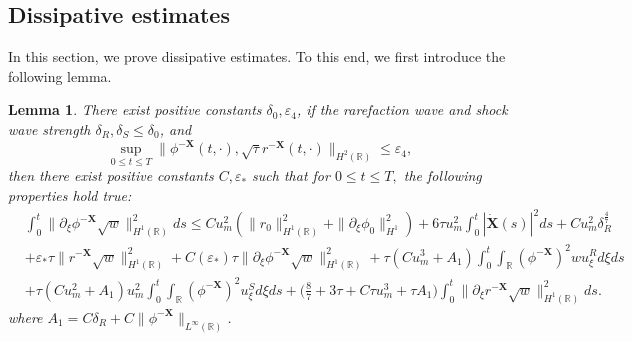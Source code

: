 \documentclass[10pt,reqno]{amsart}
\numberwithin{equation}{section}
\newtheorem{lemma}[theorem]{Lemma}
\begin{document}
	\subsection{Dissipative estimates}
	In this section, we prove dissipative estimates. To this end, we first introduce the following lemma.
	\begin{lemma}\label{lem9}
		There exist positive constants $\delta_{0},\varepsilon_{4}$, if the rarefaction wave and shock wave strength $\delta_{R},\delta_{S}\leq\delta_{0}$, and $$\sup_{0\leq t\leq T} \|\phi^{-\mathbf{X}}(t,\cdot), \sqrt{\tau}r^{-\mathbf{X}}(t,\cdot)\|_{H^2(\mathbb{R})} \leq \varepsilon_{4},$$ then there exist positive constants $C,\varepsilon_*$ such that for $0\leq t\leq T,$ the following properties hold true:
		\begin{equation}\label{de}
			\begin{aligned}
				&\int_{0}^t\|\partial_{\xi}\phi^{-\mathbf{X}}\sqrt{w}\|_{H^1(\mathbb{R})}^2ds\leq Cu_m^2\left(\|r_0\|_{H^1(\mathbb{R})}^2+\|\partial_{\xi}\phi_{0}\|_{H^1}^2\right)+6\tau u_m^2\int_{0}^t\left|\dot{\mathbf{X}}(s)\right|^2ds+Cu_m^2\delta_{R}^{\frac{4}{7}}\\
				&+\varepsilon_*\tau\|r^{-\mathbf{X}}\sqrt{w}\|_{H^1(\mathbb{R})}^2+C(\varepsilon_*)\tau\|\partial_{\xi}\phi^{-\mathbf{X}}\sqrt{w}\|_{H^1(\mathbb{R})}^2+\tau (Cu_m^3+A_1)\int_{0}^t\int_{\mathbb{R}}(\phi^{-\mathbf{X}})^2wu^R_{\xi}d\xi ds\\
				&+\tau (Cu_m^2+A_1)u_m^2\int_{0}^t\int_{\mathbb{R}}(\phi^{-\mathbf{X}})^2u^S_{\xi}d\xi ds+\bigg(\frac{8}{7}+3\tau+C\tau u_m^3+\tau A_1\bigg)\int_{0}^t\|\partial_{\xi}r^{-\mathbf{X}}\sqrt{w}\|_{H^1(\mathbb{R})}^2ds.
			\end{aligned}
		\end{equation}
		where $A_1=C\delta_R+C\|\phi^{-\mathbf{X}}\|_{L^{\infty}(\mathbb{R})}$.
	\end{lemma}
\end{document}
